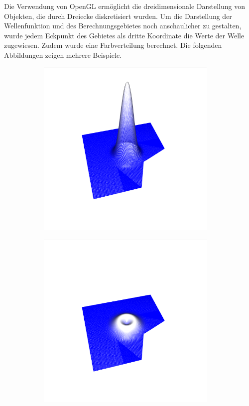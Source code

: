 \documentclass[crop=false,10pt,ngerman]{standalone}
\begin{document}
      Die Verwendung von OpenGL ermöglicht die dreidimensionale Darstellung von Objekten, die durch Dreiecke diskretisiert wurden.
      Um die Darstellung der Wellenfunktion und des Berechnungsgebietes noch anschaulicher zu gestalten, wurde jedem Eckpunkt des Gebietes als dritte Koordinate die Werte der Welle zugewiesen.
      Zudem wurde eine Farbverteilung berechnet.
      Die folgenden Abbildungen zeigen mehrere Beispiele.
      \begin{figure}[h]
        \center
        \begin{subfigure}[b]{0.24\textwidth}
          \center
          \includegraphics[trim={4cm 1.2cm 4.5cm 1.5cm},clip,width=0.95\textwidth]{images/test_wave_0.png}
          \caption{}
        \end{subfigure}
        \begin{subfigure}[b]{0.24\textwidth}
          \center
          \includegraphics[trim={4cm 1.2cm 4.5cm 1.5cm},clip,width=0.95\textwidth]{images/test_wave_1.png}

\end{subfigure}
\end{figure}
\end{document}
